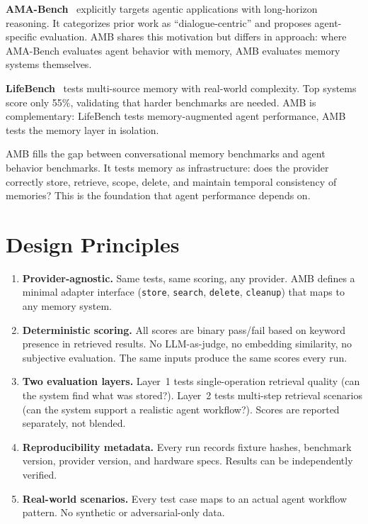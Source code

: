 \documentclass[11pt]{article}
\begin{document}
\textbf{AMA-Bench}~\citep{amabench2026} explicitly targets agentic applications with long-horizon reasoning. It categorizes prior work as ``dialogue-centric'' and proposes agent-specific evaluation. AMB shares this motivation but differs in approach: where AMA-Bench evaluates agent behavior with memory, AMB evaluates memory systems themselves.

\textbf{LifeBench}~\citep{lifebench2026} tests multi-source memory with real-world complexity. Top systems score only 55\%, validating that harder benchmarks are needed. AMB is complementary: LifeBench tests memory-augmented agent performance, AMB tests the memory layer in isolation.

AMB fills the gap between conversational memory benchmarks and agent behavior benchmarks. It tests memory as infrastructure: does the provider correctly store, retrieve, scope, delete, and maintain temporal consistency of memories? This is the foundation that agent performance depends on.

\section{Design Principles}

\begin{enumerate}
    \item \textbf{Provider-agnostic.} Same tests, same scoring, any provider. AMB defines a minimal adapter interface (\texttt{store}, \texttt{search}, \texttt{delete}, \texttt{cleanup}) that maps to any memory system.

    \item \textbf{Deterministic scoring.} All scores are binary pass/fail based on keyword presence in retrieved results. No LLM-as-judge, no embedding similarity, no subjective evaluation. The same inputs produce the same scores every run.

    \item \textbf{Two evaluation layers.} Layer~1 tests single-operation retrieval quality (can the system find what was stored?). Layer~2 tests multi-step retrieval scenarios (can the system support a realistic agent workflow?). Scores are reported separately, not blended.

    \item \textbf{Reproducibility metadata.} Every run records fixture hashes, benchmark version, provider version, and hardware specs. Results can be independently verified.

    \item \textbf{Real-world scenarios.} Every test case maps to an actual agent workflow pattern. No synthetic or adversarial-only data.
\end{enumerate}
\end{document}
